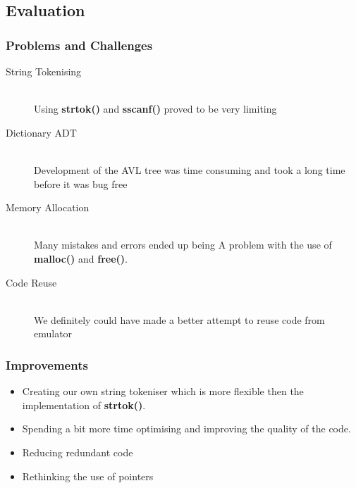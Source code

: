 \documentclass{beamer}
\begin{document}
\subsection{Evaluation}
\begin{frame}
\frametitle{Problems and Challenges}
\begin{description}
\item[String Tokenising]\hfill\\
	Using \textbf{strtok()} and \textbf{sscanf()} proved to be very limiting
	
\item[Dictionary ADT]\hfill\\
	Development of the AVL tree was time consuming and took a long time before it was bug free
	
\item[Memory Allocation]\hfill\\
	Many mistakes and errors ended up being A problem with the use of \textbf{malloc()} and \textbf{free()}.

\item[Code Reuse]\hfill\\
	We definitely could have made a better attempt to reuse code from emulator

\end{description}
\end{frame}


\begin{frame}
\frametitle{Improvements}
\begin{itemize}
	\item Creating our own string tokeniser which is more flexible then the implementation of \textbf{strtok()}.
	\item Spending a bit more time optimising and improving the quality of the code.
	\item Reducing redundant code
	\item Rethinking the use of pointers
\end{itemize}
\end{frame}

\end{document}

